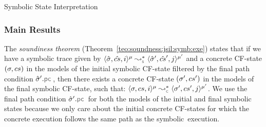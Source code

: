 \begin{display}{Symbolic State Interpretation}
{}
\end{display}

 


\subsubsection{Main Results}
The \emph{soundiness theorem} (Theorem~\ref{teo:soundness:jsil:symb:exe}) states that if we have a symbolic trace given by 
$\transabssemrule{\sstate, \scs, i}{\sstate', \scs', j}{\mode}{\mode'}{\symbolic}$ and a concrete CF-state $(\sigma, cs)$
in the models of the initial symbolic CF-state filtered by the final path condition $\sstate'.\pcsel$,  
then there exists a concrete CF-state $(\sigma', cs')$ in the models of the final symbolic CF-state, such that: 
$\transabssemrule{\jstate, \cs, i}{\jstate', \cs', j}{\mode}{\mode'}{\concrete}$. 
We use the final path condition $\sstate'.\pcsel$ for both the models of the initial and final 
symbolic states because we only care about the initial concrete CF-states for which 
the concrete execution follows the same path as the symbolic~execution. 

